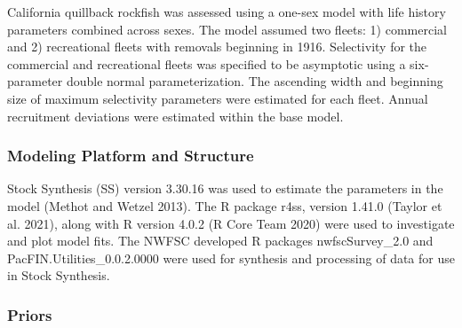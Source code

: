 \documentclass[11pt,
  english,
  a4paper,
]{article}
\begin{document}
\leavevmode\tagmcend\tagstructend


California quillback rockfish was assessed using a one-sex model with life history parameters combined across sexes. The model assumed two fleets: 1) commercial and 2) recreational fleets with removals beginning in 1916. Selectivity for the commercial and recreational fleets was specified to be asymptotic using a six-parameter double normal parameterization. The ascending width and beginning size of maximum selectivity parameters were estimated for each fleet. Annual recruitment deviations were estimated within the base model.

\leavevmode\tagmcend\tagstructend\par


\hypertarget{modeling-platform-and-structure}{%
\subsubsection{Modeling Platform and Structure}\label{modeling-platform-and-structure}}

\leavevmode\tagmcend\tagstructend


Stock Synthesis (SS) version 3.30.16 was used to estimate the parameters in the model {(Methot and Wetzel 2013)\leavevmode\tagmcend\tagstructend}. The R package r4ss, version 1.41.0 {(Taylor et al. 2021)\leavevmode\tagmcend\tagstructend}, along with R version 4.0.2 {(R Core Team 2020)\leavevmode\tagmcend\tagstructend} were used to investigate and plot model fits. The NWFSC developed R packages nwfscSurvey\_2.0 and PacFIN.Utilities\_0.0.2.0000 were used for synthesis and processing of data for use in Stock Synthesis.

\leavevmode\tagmcend\tagstructend\par


\hypertarget{priors}{%
\subsubsection{Priors}\label{priors}}
\end{document}
